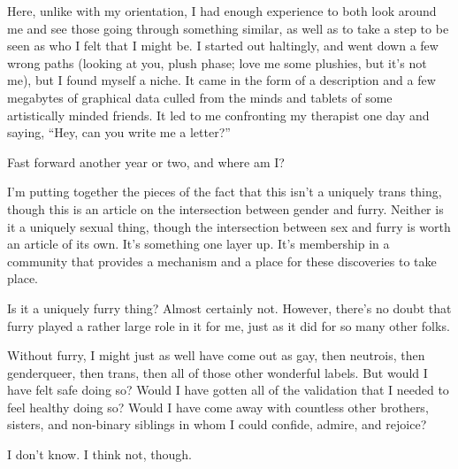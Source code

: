 Here, unlike with my orientation, I had enough experience to both look around me and see those going through something similar, as well as to take a step to be seen as who I felt that I might be.  I started out haltingly, and went down a few wrong paths (looking at you, plush phase; love me some plushies, but it's not me), but I found myself a niche.  It came in the form of a description and a few megabytes of graphical data culled from the minds and tablets of some artistically minded friends.  It led to me confronting my therapist one day and saying, ``Hey, can you write me a letter?''

Fast forward another year or two, and where am I?

I'm putting together the pieces of the fact that this isn't a uniquely trans thing, though this is an article on the intersection between gender and furry.  Neither is it a uniquely sexual thing, though the intersection between sex and furry is worth an article of its own.  It's something one layer up.  It's membership in a community that provides a mechanism and a place for these discoveries to take place.

Is it a uniquely furry thing?  Almost certainly not.  However, there's no doubt that furry played a rather large role in it for me, just as it did for so many other folks.

Without furry, I might just as well have come out as gay, then neutrois, then genderqueer, then trans, then all of those other wonderful labels.  But would I have felt safe doing so?  Would I have gotten all of the validation that I needed to feel healthy doing so?  Would I have come away with countless other brothers, sisters, and non-binary siblings in whom I could confide, admire, and rejoice?

I don't know.  I think not, though.
